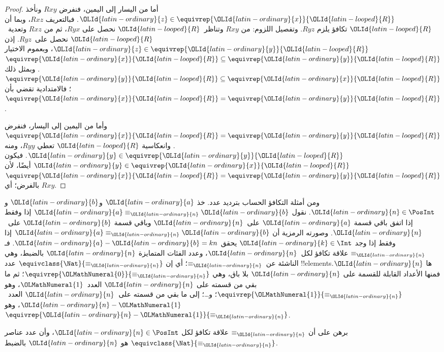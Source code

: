 \documentclass[../../../include/open-logic-section]{subfiles}
\begin{document}
\begin{proof}
أما من اليسار إلى اليمين، فنفرض $Rxy$ ونأخذ ${\OLId{latin-ordinary}{z}} \in
\equivrep{{\OLId{latin-ordinary}{x}}}{{\OLId{latin-looped}{R}}}$. فبالتعريف $Rxz$، وبما أن ${\OLId{latin-looped}{R}}$ تكافؤ يلزم $Ryz$.
وتفصيل اللزوم: من $Rxy$ وتناظر~${\OLId{latin-looped}{R}}$ نحصل على $Ryx$، ثم من
$Rxz$ وتعدية~${\OLId{latin-looped}{R}}$ نحصل على~$Ryz$. إذن ${\OLId{latin-ordinary}{z}} \in \equivrep{{\OLId{latin-ordinary}{y}}}{{\OLId{latin-looped}{R}}}$،
وبعموم الاختيار $\equivrep{{\OLId{latin-ordinary}{x}}}{{\OLId{latin-looped}{R}}} \subseteq \equivrep{{\OLId{latin-ordinary}{y}}}{{\OLId{latin-looped}{R}}}$.
وبمثل ذلك $\equivrep{{\OLId{latin-ordinary}{y}}}{{\OLId{latin-looped}{R}}} \subseteq \equivrep{{\OLId{latin-ordinary}{x}}}{{\OLId{latin-looped}{R}}}$؛ فالامتدادية
تقضي بأن $\equivrep{{\OLId{latin-ordinary}{x}}}{{\OLId{latin-looped}{R}}} = \equivrep{{\OLId{latin-ordinary}{y}}}{{\OLId{latin-looped}{R}}}$.

وأما من اليمين إلى اليسار، فنفرض $\equivrep{{\OLId{latin-ordinary}{x}}}{{\OLId{latin-looped}{R}}} =
\equivrep{{\OLId{latin-ordinary}{y}}}{{\OLId{latin-looped}{R}}}$. وانعكاسية ${\OLId{latin-looped}{R}}$ تعطي $Ryy$، ومنه
${\OLId{latin-ordinary}{y}} \in \equivrep{{\OLId{latin-ordinary}{y}}}{{\OLId{latin-looped}{R}}}$. فيكون ${\OLId{latin-ordinary}{y}} \in \equivrep{{\OLId{latin-ordinary}{x}}}{{\OLId{latin-looped}{R}}}$ أيضًا،
لأن $\equivrep{{\OLId{latin-ordinary}{x}}}{{\OLId{latin-looped}{R}}} = \equivrep{{\OLId{latin-ordinary}{y}}}{{\OLId{latin-looped}{R}}}$ بالفرض؛ أي $Rxy$.
\end{proof}

\begin{ex}
ومن أمثلة التكافؤ الحساب بترديد عدد. خذ ${\OLId{latin-ordinary}{a}}$ و${\OLId{latin-ordinary}{b}}$ و${\OLId{latin-ordinary}{n}} \in \PosInt$.
نقول ${\OLId{latin-ordinary}{a}} \equiv_{\OLId{latin-ordinary}{n}} {\OLId{latin-ordinary}{b}}$ إذا وفقط إذا اتفق باقي قسمة ${\OLId{latin-ordinary}{a}}$ على~${\OLId{latin-ordinary}{n}}$
وباقي قسمة ${\OLId{latin-ordinary}{b}}$ على~${\OLId{latin-ordinary}{n}}$. وصورته الرمزية أن ${\OLId{latin-ordinary}{a}} \equiv_{\OLId{latin-ordinary}{n}} {\OLId{latin-ordinary}{b}}$ إذا وفقط
إذا وجد ${\OLId{latin-ordinary}{k}} \in \Int$ يحقق ${\OLId{latin-ordinary}{a}} - {\OLId{latin-ordinary}{b}} = kn$. فـ$\equiv_{\OLId{latin-ordinary}{n}}$ علاقة تكافؤ
لكل~${\OLId{latin-ordinary}{n}}$، وعدد الفئات المتمايزة ${\OLId{latin-ordinary}{n}}$ بالضبط، وهي الناشئة عن~$\equiv_{\OLId{latin-ordinary}{n}}$؛ أي إن
$\equivclass{\Nat}{\equiv_{\OLId{latin-ordinary}{n}}}$ عدد !!{element}sها ${\OLId{latin-ordinary}{n}}$.
فمنها الأعداد القابلة للقسمة على ${\OLId{latin-ordinary}{n}}$ بلا باق، وهي
$\equivrep{{\OLMathNumeral{0}}}{\equiv_{\OLId{latin-ordinary}{n}}}$؛ ثم ما بقي من قسمته على ${\OLId{latin-ordinary}{n}}$ العدد~${\OLMathNumeral{1}}$،
وهو $\equivrep{{\OLMathNumeral{1}}}{\equiv_{\OLId{latin-ordinary}{n}}}$؛ و\ldots؛ إلى ما بقي من قسمته على~${\OLId{latin-ordinary}{n}}$
العدد~${\OLId{latin-ordinary}{n}}-{\OLMathNumeral{1}}$، وهو~$\equivrep{{\OLId{latin-ordinary}{n}}-{\OLMathNumeral{1}}}{\equiv_{\OLId{latin-ordinary}{n}}}$.
\end{ex}

\begin{prob}
برهن على أن $\equiv_{\OLId{latin-ordinary}{n}}$ علاقة تكافؤ لكل ${\OLId{latin-ordinary}{n}} \in \PosInt$، وأن
عدد عناصر $\equivclass{\Nat}{\equiv_{\OLId{latin-ordinary}{n}}}$ هو ${\OLId{latin-ordinary}{n}}$ بالضبط.
\end{prob}
\end{document}
